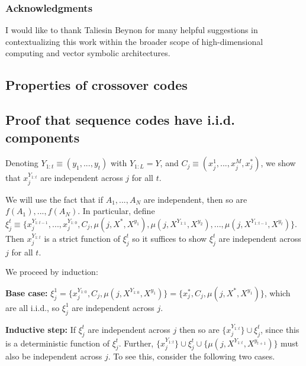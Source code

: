 \documentclass{article}
\begin{document}
\subsubsection*{Acknowledgments}

I would like to thank Taliesin Beynon for many helpful suggestions in contextualizing this work within the broader scope of high-dimensional computing and vector symbolic architectures.


  

\begin{appendices}
\section{Properties of crossover codes}

\subsection{Proof that sequence codes have i.i.d. components}

Denoting $Y_{1:t} \equiv (y_1, ..., y_t)$ with $Y_{1:L} = Y$, and $C_j \equiv (x^1_j, ..., x^M_j, x^*_j)$, we show that $x_j^{Y_{1:t}}$ are independent across $j$ for all $t$.

We will use the fact that if $A_1, ..., A_N$ are independent, then so are $f(A_1), ..., f(A_N)$. In particular, define $\xi^t_j \equiv \{x_j^{Y_{1:t-1}}, ..., x_j^{Y_{1:0}}, C_j, \mu(j, X^*, X^{y_1}), \mu(j, X^{Y_{1:1}}, X^{y_2}), ..., \mu(j, X^{Y_{1:t-1}}, X^{y_t})\}$. Then $x_j^{Y_{1:t}}$ is a strict function of $\xi^t_j$ so it suffices to show $\xi^t_j$ are independent across $j$ for all $t$.

We proceed by induction:

\textbf{Base case:} $\xi^1_j = \{x^{Y_{1:0}}_j, C_j, \mu(j, X^{Y_{1:0}}, X^{y_1})\} = \{x^*_j, C_j, \mu(j, X^*, X^{y_1})\}$, which are all i.i.d., so $\xi^1_j$ are independent across $j$.

\textbf{Inductive step:} If $\xi^t_j$ are independent across $j$ then so are $\{x_j^{Y_{1:t}}\} \cup \xi^t_j$, since this is a deterministic function of $\xi^t_j$. Further, $\{x_j^{Y_{1:t}}\} \cup \xi^t_j \cup \{\mu(j, X^{Y_{1:t}}, X^{y_{t+1}})\}$ must also be independent across $j$. To see this, consider the following two cases.


\end{appendices}
\end{document}
